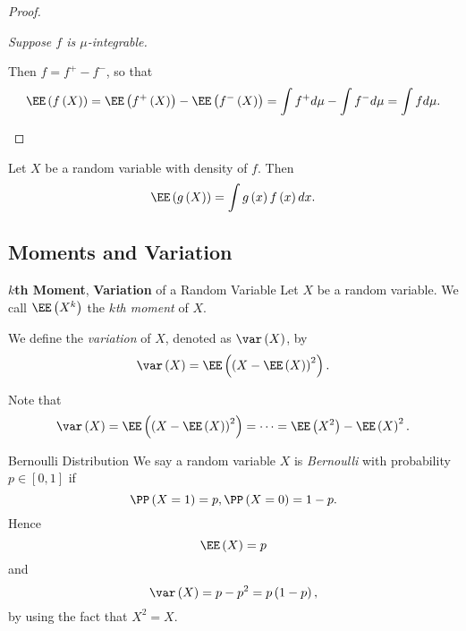 \documentclass[stat901]{subfiles}
\begin{document}
\begin{proof}
        \begin{case}
            \textit{Suppose $f$ is $\mu$-integrable.}

            Then $f=f^+-f^-$, so that
            \begin{equation*}
                \EE\left( f\left( X \right) \right) = \EE\left( f^+\left( X \right) \right) - \EE\left( f^-\left( X \right) \right) = \int f^+d\mu - \int f^-d\mu = \int fd\mu.
            \end{equation*}
        \end{case}
    \end{proof}

    \begin{cor}{}
        Let $X$ be a random variable with density of $f$. Then
        \begin{equation*}
            \EE\left( g\left( X \right) \right) = \int g\left( x \right)f\left( x \right)dx.
        \end{equation*}
    \end{cor}	

    \rruleline

    \subsection{Moments and Variation}
    

    \begin{definition}{\textbf{$k$th Moment}, \textbf{Variation} of a Random Variable}
        Let $X$ be a random variable. We call $\EE\left( X^k \right)$ the \emph{$k$th moment} of $X$.

        We define the \emph{variation} of $X$, denoted as $\var\left( X \right)$, by
        \begin{equation*}
            \var\left( X \right) = \EE\left( \left( X-\EE\left( X \right) \right)^{2} \right).
        \end{equation*}
    \end{definition}

    \np Note that
    \begin{equation*}
        \var\left( X \right) = \EE\left( \left( X-\EE\left( X \right) \right)^{2} \right) = \cdots = \EE\left( X^{2} \right) - \EE\left( X \right)^{2}.
    \end{equation*}

    \begin{example}{Bernoulli Distribution}
        We say a random variable $X$ is \emph{Bernoulli} with probability $p\in\left[ 0,1 \right]$ if
        \begin{equation*}
            \PP\left( X=1 \right) = p, \PP\left( X=0 \right) = 1-p.
        \end{equation*}
        Hence
        \begin{equation*}
            \EE\left( X \right) = p
        \end{equation*}
        and
        \begin{equation*}
            \var\left( X \right) = p-p^{2} = p\left( 1-p \right),
        \end{equation*}
        by using the fact that $X^{2}=X$.
    \end{example}
\end{document}
